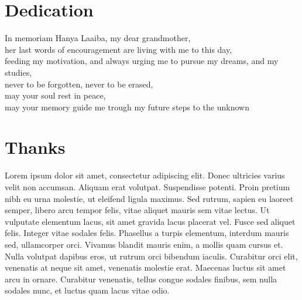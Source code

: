 
\chapter*{Dedication}
\thispagestyle{empty}
%
\begin{center}
  In memoriam Hanya Laaiba, my dear grandmother, ~ \\
  her last words of encouragement are living with me to this day, ~ \\
  feeding my motivation, and always urging me to pursue my dreams, and my studies, ~\\
  never to be forgotten, never to be erased, ~ \\
  may your soul rest in peace, ~ \\
  may your memory guide me trough my future steps to the unknown ~ \\


\end{center}
%
%
%
%
%
%
%
\cleardoublepage%
\chapter*{Thanks}
\thispagestyle{empty}
%
Lorem ipsum dolor sit amet, consectetur adipiscing elit. Donec ultricies varius velit non accumsan. Aliquam erat volutpat. Suspendisse potenti. Proin pretium nibh eu urna molestie, ut eleifend ligula maximus. Sed rutrum, sapien eu laoreet semper, libero arcu tempor felis, vitae aliquet mauris sem vitae lectus. Ut vulputate elementum lacus, sit amet gravida lacus placerat vel. Fusce sed aliquet felis. Integer vitae sodales felis. Phasellus a turpis elementum, interdum mauris sed, ullamcorper orci. Vivamus blandit mauris enim, a mollis quam cursus et. Nulla volutpat dapibus eros, ut rutrum orci bibendum iaculis. Curabitur orci elit, venenatis at neque sit amet, venenatis molestie erat. Maecenas luctus sit amet arcu in ornare. Curabitur venenatis, tellus congue sodales finibus, sem nulla sodales nunc, et luctus quam lacus vitae odio.
\cleardoublepage%
